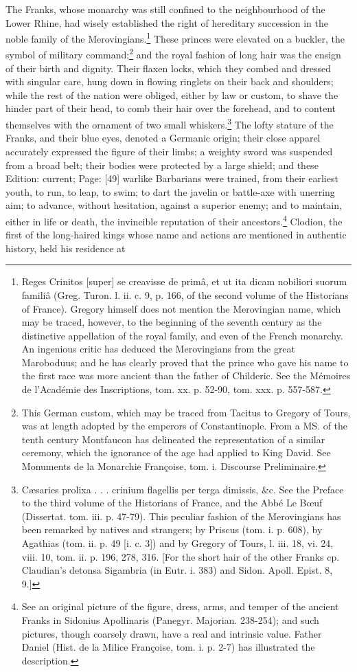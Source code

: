 The Franks, whose monarchy was still confined to the neighbourhood of the Lower Rhine, had wisely established the right of hereditary succession in the noble family of the Merovingians.\footnote{Reges Crinitos [super] se creavisse de primâ, et ut ita dicam nobiliori suorum familiâ (Greg. Turon. l. ii. c. 9, p. 166, of the second volume of the Historians of France). Gregory himself does not mention the Merovingian name, which may be traced, however, to the beginning of the seventh century as the distinctive appellation of the royal family, and even of the French monarchy. An ingenious critic has deduced the Merovingians from the great Maroboduus; and he has clearly proved that the prince who gave his name to the first race was more ancient than the father of Childeric. See the Mémoires de l\texthebrew{}’Académie des Inscriptions, tom. xx. p. 52-90, tom. xxx. p. 557-587.} These princes were elevated on a buckler, the symbol of military command;\footnote{This German custom, which may be traced from Tacitus to Gregory of Tours, was at length adopted by the emperors of Constantinople. From a MS. of the tenth century Montfaucon has delineated the representation of a similar ceremony, which the ignorance of the age had applied to King David. See Monuments de la Monarchie Françoise, tom. i. Discourse Preliminaire.} and the royal fashion of long hair was the ensign of their birth and dignity. Their flaxen locks, which they combed and dressed with singular care, hung down in flowing ringlets on their back and shoulders; while the rest of the nation were obliged, either by law or custom, to shave the hinder part of their head, to comb their hair over the forehead, and to content themselves with the ornament of two small whiskers.\footnote{Cæsaries prolixa . . . crinium flagellis per terga dimissis, \&c. See the Preface to the third volume of the Historians of France, and the Abbé Le Bœuf (Dissertat. tom. iii. p. 47-79). This peculiar fashion of the Merovingians has been remarked by natives and strangers; by Priscus (tom. i. p. 608), by Agathias (tom. ii. p. 49 [i. c. 3]) and by Gregory of Tours, l. iii. 18, vi. 24, viii. 10, tom. ii. p. 196, 278, 316. [For the short hair of the other Franks cp. Claudian\texthebrew{}’s detonsa Sigambria (in Eutr. i. 383) and Sidon. Apoll. Epist. 8, 9.]} The lofty stature of the Franks, and their blue eyes, denoted a Germanic origin; their close apparel accurately expressed the figure of their limbs; a weighty sword was suspended from a broad belt; their bodies were protected by a large shield; and these Edition: current; Page: [49] warlike Barbarians were trained, from their earliest youth, to run, to leap, to swim; to dart the javelin or battle-axe with unerring aim; to advance, without hesitation, against a superior enemy; and to maintain, either in life or death, the invincible reputation of their ancestors.\footnote{See an original picture of the figure, dress, arms, and temper of the ancient Franks in Sidonius Apollinaris (Panegyr. Majorian. 238-254); and such pictures, though coarsely drawn, have a real and intrinsic value. Father Daniel (Hist. de la Milice Françoise, tom. i. p. 2-7) has illustrated the description.} Clodion, the first of the long-haired kings whose name and actions are mentioned in authentic history, held his residence at 